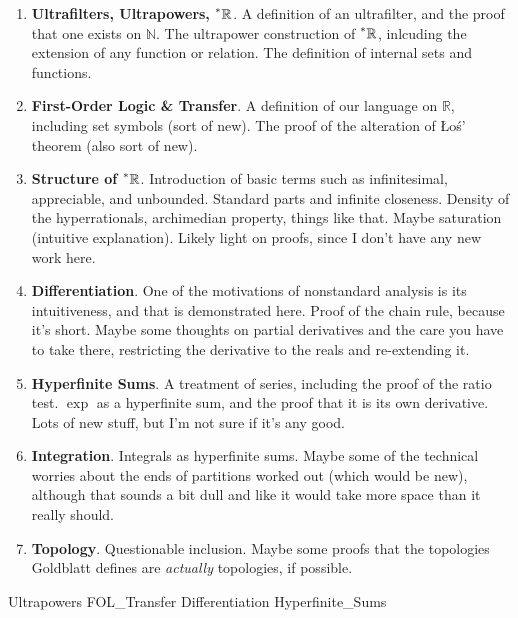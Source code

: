 \documentclass{article}
\newcommand{\reals}{\mathbb{R}}
\newcommand{\hreals}{\prescript{*}{}{\mathbb{R}}}
\newcommand{\nats}{\mathbb{N}}
\theoremstyle{definition}
\begin{document}
\begin{enumerate}
    \item \textbf{Ultrafilters, Ultrapowers, $\hreals$}. A definition of an ultrafilter, and the proof that one exists on $\nats$. The ultrapower construction of $\hreals$, inlcuding the extension of any function or relation. The definition of internal sets and functions.
    \item \textbf{First-Order Logic \& Transfer}. A definition of our language on $\reals$, including set symbols (sort of new). The proof of the alteration of \L o\'s' theorem (also sort of new).
    \item \textbf{Structure of $\hreals$}. Introduction of basic terms such as infinitesimal, appreciable, and unbounded. Standard parts and infinite closeness. Density of the hyperrationals, archimedian property, things like that. Maybe saturation (intuitive explanation). Likely light on proofs, since I don't have any new work here.
    \item \textbf{Differentiation}. One of the motivations of nonstandard analysis is its intuitiveness, and that is demonstrated here. Proof of the chain rule, because it's short. Maybe some thoughts on partial derivatives and the care you have to take there, restricting the derivative to the reals and re-extending it.
    \item \textbf{Hyperfinite Sums}. A treatment of series, including the proof of the ratio test. $\exp$ as a hyperfinite sum, and the proof that it is its own derivative. Lots of new stuff, but I'm not sure if it's any good.
    \item \textbf{Integration}. Integrals as hyperfinite sums. Maybe some of the technical worries about the ends of partitions worked out (which would be new), although that sounds a bit dull and like it would take more space than it really should. 
    \item \textbf{Topology}. Questionable inclusion. Maybe some proofs that the topologies Goldblatt defines are \textit{actually} topologies, if possible.
\end{enumerate}

{Ultrapowers}
{FOL_Transfer}
{Differentiation}
{Hyperfinite_Sums}


\nocite{*}
\end{document}
